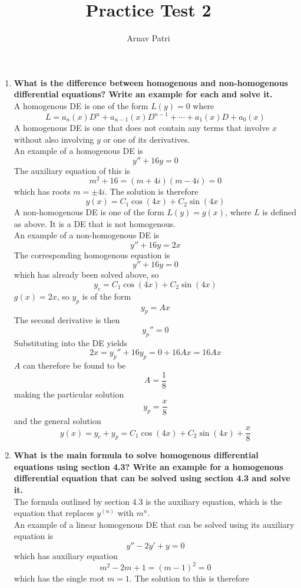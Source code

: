 \documentclass[12pt]{article}
\title{Practice Test 2}
\author{Arnav Patri}
\begin{document}
	\maketitle
	\begin{enumerate}
		\item \textbf{What is the difference between homogenous and non-homogenous differential equations? Write an example for each and solve it.} \\
			A homogenous DE is one of the form \(L(y) = 0\) where
				\[L = a_n(x)D^n + a_{n - 1}(x)D^{n - 1} + \cdots + a_1(x)D + a_0(x)\]
				A homogenous DE is one that does not contain any terms that involve \(x\) without also involving \(y\) or one of its derivatives. \\
			An example of a homogenous DE is 
				\[y'' + 16y = 0\]
				The auxiliary equation of this is
				\[m^2 + 16 = (m + 4i)(m - 4i) = 0\]
				which has roots \(m = \pm 4i\). The solution is therefore
				\[y(x) = C_1\cos(4x) + C_2\sin(4x)\]
			A non-homogenous DE is one of the form \(L(y) = g(x)\), where \(L\) is defined as above. It is a DE that is not homogenous. \\
			An example of a non-homogenous DE is 
				\[y'' + 16y = 2x\]
				The corresponding homogenous equation is
				\[y'' + 16y = 0\]
				which has already been solved above, so
				\[y_c = C_1\cos(4x) + C_2\sin(4x)\]
				\(g(x) = 2x\), so \(y_p\) is of the form
				\[y_p = Ax\]
				The second derivative is then
				\[y_p'' = 0\]
				Substituting into the DE yields
				\[
					2x = y_p'' + 16y_p
						= 0 + 16Ax
						= 16Ax
				\]
				\(A\) can therefore be found to be
				\[A = \frac{1}{8}\]
				making the particular solution
				\[y_p = \frac{x}{8}\]
				and the general solution
				\[
					y(x) = y_c + y_p
						= C_1\cos(4x) + C_2\sin(4x) + \frac{x}{8}
				\]
		\item \textbf{What is the main formula to solve homogenous differential equations using section 4.3? Write an example for a homogenous differential equation that can be solved using section 4.3 and solve it.} \\
			The formula outlined by section 4.3 is the auxiliary equation, which is the equation that replaces \(y^{(n)}\) with \(m^n\). \\
			An example of a linear homogenous DE that can be solved using its auxiliary equation is
				\[y'' - 2y' + y = 0\]
				which has auxiliary equation
				\[
					m^2 - 2m + 1 = (m - 1)^2
						= 0
				\]
				which has the single root \(m = 1\). The solution to this is therefore

\end{enumerate}
\end{document}
